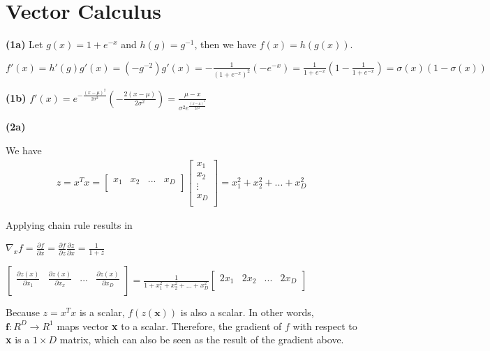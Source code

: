 \documentclass[12pt,article]{article}
\begin{document}
\newpage
\section*{Vector Calculus}
\textbf{(1a)} \newline
Let $g(x) = 1 + e^{-x}$ and $h(g) = g^{-1}$, then we have $f(x) = h(g(x))$.

$f'(x) = h'(g)g'(x) = (-g^{-2})g'(x) = -\frac{1}{(1 + e^{-x})^2} (-e^{-x}) = 
    \frac{1}{1 + e^{-x}} (1 - \frac{1}{1 + e^{-x}}) = \sigma(x)(1 - \sigma(x))$

\textbf{(1b)} \newline
$f'(x) = e^{-\frac{(x - \mu)^2}{2\sigma^2}} (-\frac{2(x - \mu)}{2\sigma^2})
= \frac{\mu - x}{\sigma^2 e^{\frac{(x - \mu)^2}{2\sigma^2}}}$

\textbf{(2a)} \newline

We have 
\begin{align*}
z = x^Tx =
    \left[\begin{array}{cccc}
        x_1 & x_2 & ... & x_D \\
    \end{array}\right]
    \begin{bmatrix}
        x_1     \\
        x_2     \\
        \vdots  \\
        x_D     \\
    \end{bmatrix}
= x_1^2 + x_2^2 + ... + x_D^2
\end{align*}

Applying chain rule results in 

$\nabla_xf = \frac{\partial f}{\partial x} = \frac{\partial f}{\partial z} 
\frac{\partial z}{\partial x} = \frac{1}{1 + z} $

$
\begin{bmatrix}
    \frac{\partial z(x)}{\partial x_1} & \frac{\partial z(x)}{\partial x_x} & ... & \frac{\partial z(x)}{\partial x_D} \\
\end{bmatrix}
= \frac{1}{1 + x_1^2 + x_2^2 + ... + x_D^2} 
\begin{bmatrix}
    2x_1 & 2x_2 & ... & 2x_D \\
\end{bmatrix}
$

Because $z = x^Tx$ is a scalar, $f(z(\textbf{x}))$ is also a scalar. In other 
words, $\textbf{f} : R^D \rightarrow R^1$ maps vector \textbf{x} to a scalar. 
Therefore, the gradient of $f$ with respect to \textbf{x} is a $1 \times D$ 
matrix, which can also be seen as the result of the gradient above.
\end{document}
